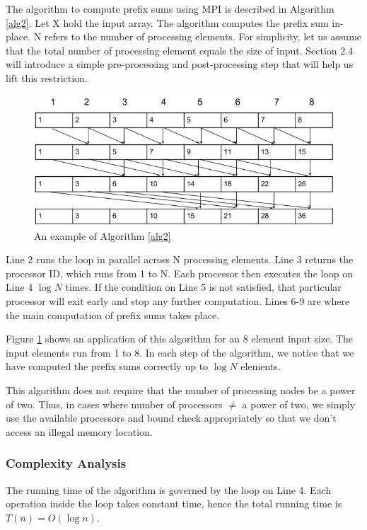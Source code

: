 \documentclass[11pt]{article}
\begin{document}
The algorithm to compute prefix sums using MPI is described in Algorithm \ref{alg2}. Let X hold the input array. The algorithm computes the prefix sum in-place. N refers to the number of processing elements. For simplicity, let us assume that the total number of processing element equals the size of input. Section 2.4 will introduce a simple pre-processing and post-processing step that will help us lift this restriction. 

\begin{figure}[h!]
    \centering
        \includegraphics[scale=0.34]{MPI.jpg}
        \caption{An example of Algorithm \ref{alg2}}
        \label{fig1}
    \centering
\end{figure}

Line 2 runs the loop in parallel across N processing elements. Line 3 returns the processor ID, which runs from 1 to N. Each processor then executes the loop on Line 4 $\log N$ times. If the condition on Line 5 is not satisfied, that particular processor will exit early and stop any further computation. Lines 6-9 are where the main computation of prefix sums takes place.

Figure \ref{fig1} shows an application of this algorithm for an 8 element input size. The input elements run from 1 to 8. In each step of the algorithm, we notice that we have computed the prefix sums correctly up to $\log N$ elements.

This algorithm does not require that the number of processing nodes be a power of two. Thus, in cases where number of processors $\neq$ a power of two, we simply use the available processors and bound check appropriately so that we don't access an illegal memory location.

\subsubsection{Complexity Analysis}
The running time of the algorithm is governed by the loop on Line 4. Each operation inside the loop takes constant time, hence the total running time is \(T(n) = O(\log n)\).
\end{document}

